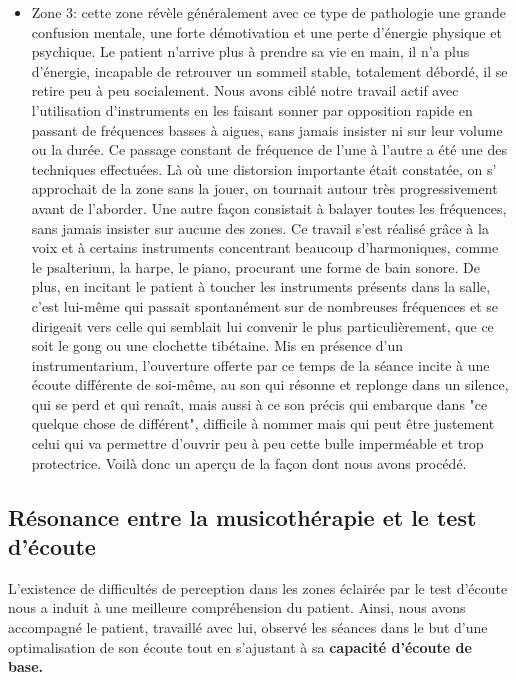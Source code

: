 \begin{itemize}
	\item Zone 3: cette zone révèle généralement avec ce type de pathologie une grande  confusion 
	mentale, 
	une 
	forte  démotivation et une  perte d'énergie physique et 
	psychique. Le patient n'arrive plus à prendre sa vie en main, il n'a plus d'énergie, incapable de 
	retrouver un sommeil stable,
	totalement débordé, il se retire peu à peu socialement.%
	Nous avons ciblé notre travail actif avec l'utilisation d'instruments  en les faisant sonner par opposition 
	rapide en passant de  fréquences basses à aigues, 
	sans jamais insister ni sur leur volume ou la durée. Ce passage constant de fréquence de l'une à 
	l'autre a été une des 
	techniques effectuées.  Là où une distorsion importante était constatée, on s' approchait de la zone 
	sans la jouer, on tournait 
	autour très progressivement avant de l'aborder. Une autre façon consistait à balayer toutes les 
	fréquences, sans jamais 
	insister sur 
	aucune des zones. Ce travail s'est réalisé grâce à la voix et à certains instruments concentrant 
	beaucoup d'harmoniques,  
	comme le psalterium, la harpe, le piano, procurant une forme  de bain sonore. De plus, en incitant le 
	patient à 
	toucher 
	les 
	instruments présents dans la salle, c'est lui-même  qui passait spontanément sur de nombreuses 
	fréquences et se dirigeait vers celle qui semblait lui convenir le plus particulièrement, que ce soit le 
	gong ou une clochette tibétaine. Mis en présence d'un instrumentarium, l'ouverture offerte par ce 
	temps de la séance incite à une écoute différente de soi-même, au son qui résonne et replonge dans 
	un silence, qui se perd et qui renaît, mais aussi à ce son précis qui embarque dans "ce quelque chose 
	de différent", difficile à nommer mais qui peut être justement celui qui va permettre d'ouvrir peu à peu 
	cette bulle imperméable et trop protectrice.
	Voilà donc un aperçu de la  façon dont nous avons  procédé. 
\end{itemize}


\subsection{Résonance entre %
	la musicothérapie et le test d'écoute}

L'existence de difficultés de perception dans les zones éclairée par le test d'écoute nous a
	induit à une meilleure compréhension du patient. %
	  Ainsi, nous avons accompagné le patient, travaillé avec lui, observé les séances dans le but d'une 
	  optimalisation de 
	son écoute %
	tout en s'ajustant  à sa 
	\textbf{capacité 
	d'écoute de base.} 
%


